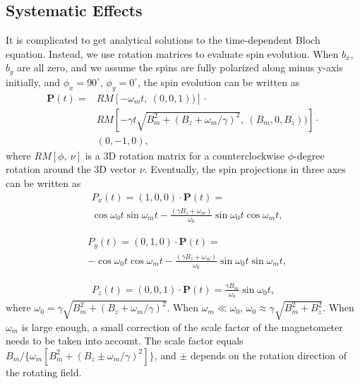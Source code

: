 \documentclass[prx,twocolumn,10pt,nofootinbib]{revtex4-1}
\begin{document}
\subsection{Systematic Effects}\label{sec:systematics}
It is complicated to get analytical solutions to the time-dependent Bloch equation. Instead, we use rotation matrices to evaluate spin evolution. When $b_x$, $b_y$ are all zero, and we assume the spins are fully polarized along minus y-axis initially, and $\phi_x=90^{\circ}$, $\phi_y=0^{\circ}$, the spin evolution can be written as
\begin{equation}
\begin{aligned}
	\bm{P}(t) = & RM[-\omega_m t, ~(0, 0, 1))] \cdot \\
	&RM[-\gamma t \sqrt{B_m^2 + (B_z + \omega_m/\gamma)^2}, ~(B_m, 0, B_z))] \cdot \\
	& (0, -1, 0),
\label{eq:rm}
\end{aligned}
\end{equation}
where $RM[\phi,~\nu]$ is a 3D rotation matrix for a counterclockwise $\phi$-degree rotation around the 3D vector $\nu$. Eventually, the spin projections in three axes can be written as
\begin{equation}
\begin{aligned}
& P_x(t) = (1,0,0) \cdot \bm{P}(t) =\\
&\cos \omega_0 t \sin \omega_m t-\frac{(\gamma B_z+\omega_m)}{\omega_0} \sin\omega_0t \cos \omega_m t ,
\label{eq:sx}
\end{aligned}
\end{equation}

\begin{equation}
\begin{aligned}
&P_y(t) = (0,1,0) \cdot \bm{P}(t) =\\
&-\cos \omega_0 t \cos \omega_m t- \frac{(\gamma B_z+\omega_m)}{\omega_0} \sin \omega_0t \sin \omega_m t,
\label{eq:sy}
\end{aligned}
\end{equation}

\begin{equation}
\begin{aligned}
P_z(t) = (0,0,1) \cdot \bm{P}(t) = \frac{\gamma B_m }{\omega_0}\sin \omega_0 t,
\label{eq:sz}
\end{aligned}
\end{equation}
where $\omega_0 = \gamma \sqrt{B_m^2+(B_z+\omega_m/\gamma)^2}$. When $\omega_m \ll \omega_0$, $\omega_0 \approx \gamma \sqrt{B_m^2+B_z^2}$. When $\omega_m$ is large enough, a small correction of the scale factor of the magnetometer needs to be taken into account. The scale factor equals $B_m/\{\omega_m[B_m^2+(B_z \pm \omega_m/\gamma)^2]\}$, and $\pm$ depends on the rotation direction of the rotating field. 
\end{document}
